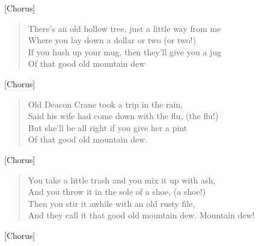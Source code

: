 [Chorus]

\begin{verse}
There's an old hollow tree, just a little way from me \\
Where you lay down a dollar or two (or two!) \\
If you hush up your mug, then they'll give you a jug \\
Of that good old mountain dew \\
\end{verse}

[Chorus]

\begin{verse}
Old Deacon Crane took a trip in the rain, \\
Said his wife had come down with the flu, (the flu!) \\
But she'll be all right if you give her a pint \\
Of that good old mountain dew. \\
\end{verse}

[Chorus]

\begin{verse}
You take a little trash and you mix it up with ash, \\
And you throw it in the sole of a shoe, (a shoe!) \\
Then you stir it awhile with an old rusty file, \\
And they call it that good old mountain dew. Mountain dew! \\
\end{verse}

[Chorus]
